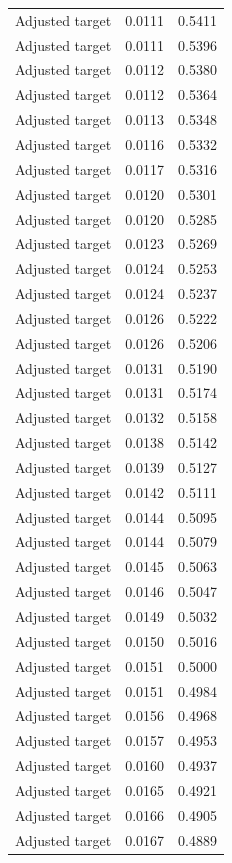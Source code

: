 \begin{table}[htbp]
\begin{tabular}{lll}
Adjusted target & 0.0111 & 0.5411 \\
Adjusted target & 0.0111 & 0.5396 \\
Adjusted target & 0.0112 & 0.5380 \\
Adjusted target & 0.0112 & 0.5364 \\
Adjusted target & 0.0113 & 0.5348 \\
Adjusted target & 0.0116 & 0.5332 \\
Adjusted target & 0.0117 & 0.5316 \\
Adjusted target & 0.0120 & 0.5301 \\
Adjusted target & 0.0120 & 0.5285 \\
Adjusted target & 0.0123 & 0.5269 \\
Adjusted target & 0.0124 & 0.5253 \\
Adjusted target & 0.0124 & 0.5237 \\
Adjusted target & 0.0126 & 0.5222 \\
Adjusted target & 0.0126 & 0.5206 \\
Adjusted target & 0.0131 & 0.5190 \\
Adjusted target & 0.0131 & 0.5174 \\
Adjusted target & 0.0132 & 0.5158 \\
Adjusted target & 0.0138 & 0.5142 \\
Adjusted target & 0.0139 & 0.5127 \\
Adjusted target & 0.0142 & 0.5111 \\
Adjusted target & 0.0144 & 0.5095 \\
Adjusted target & 0.0144 & 0.5079 \\
Adjusted target & 0.0145 & 0.5063 \\
Adjusted target & 0.0146 & 0.5047 \\
Adjusted target & 0.0149 & 0.5032 \\
Adjusted target & 0.0150 & 0.5016 \\
Adjusted target & 0.0151 & 0.5000 \\
Adjusted target & 0.0151 & 0.4984 \\
Adjusted target & 0.0156 & 0.4968 \\
Adjusted target & 0.0157 & 0.4953 \\
Adjusted target & 0.0160 & 0.4937 \\
Adjusted target & 0.0165 & 0.4921 \\
Adjusted target & 0.0166 & 0.4905 \\
Adjusted target & 0.0167 & 0.4889 \\

\end{tabular}
\end{table}
